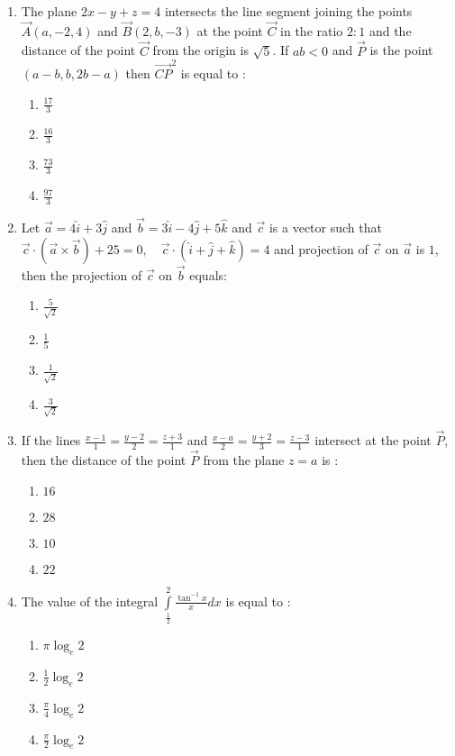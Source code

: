 \documentclass[journal,12pt,twocolumn]{IEEEtran}
\theoremstyle{remark}
\begin{document}
\begin{enumerate}
    \item The plane $2x-y+z=4$ intersects the line segment joining the points $\vec{A}(a, -2, 4)$ and $\vec{B}(2, b, -3)$ at the point $\vec{C}$ in the ratio $2:1$ and the distance of the point $\vec{C}$ from the origin is $\sqrt{5}$. If $ab<0$ and $\vec{P}$ is the point $(a-b,b,2b-a)$ then $\vec{CP}^2$ is equal to :
        \begin{enumerate}
            \item $\frac{17}{3}$
            \item $\frac{16}{3}$
            \item $\frac{73}{3}$
            \item $\frac{97}{3}$
        \end{enumerate}

    \item Let $\vec{a} = 4\hat{i} + 3\hat{j}$ and $\vec{b} = 3\hat{i} - 4\hat{j} + 5\hat{k}$ and $\vec{c}$ is a vector such that $\vec{c} \cdot (\vec{a} \times \vec{b}) + 25 = 0, \quad \vec{c} \cdot (\hat{i} + \hat{j} + \hat{k}) = 4$ and projection of $\vec{c}$ on $\vec{a}$ is $1$, then the projection of $\vec{c}$ on $\vec{b}$ equals:
        \begin{enumerate}
            \item $\frac{5}{\sqrt{2}}$
            \item $\frac{1}{5}$
            \item $\frac{1}{\sqrt{2}}$
            \item $\frac{3}{\sqrt{2}}$
        \end{enumerate}

    \item If the lines $\frac{x-1}{1} = \frac{y-2}{2} = \frac{z+3}{1}$ and $\frac{x-a}{2} = \frac{y+2}{3} = \frac{z-3}{1}$ intersect at the point $\vec{P}$, then the distance of the point $\vec{P}$ from the plane $z=a$ is :
        \begin{enumerate}
            \item $16$
            \item $28$
            \item $10$
            \item $22$
        \end{enumerate}

    \item The value of the integral $\int\limits_\frac{1}{2}^2\frac{\tan^{-1}x}{x}dx$ is equal to :
        \begin{enumerate}
            \item $\pi\log_e2$
            \item $\frac{1}{2}\log_e2$
            \item $\frac{\pi}{4}\log_e2$
            \item $\frac{\pi}{2}\log_e2$
        \end{enumerate}

\end{enumerate}
\end{document}
